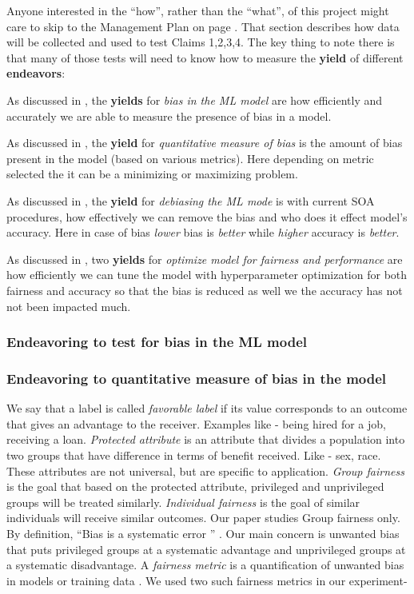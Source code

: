Anyone  interested in the ``how'', rather than the ``what'', of this project
might care to skip to the Management Plan on page \pageref{tion:plan}. That section 
 describes how  data
will be collected  and used
to test Claims 1,2,3,4.  The key thing to note
there is that many of those
tests will need to know how to measure
the {\bf yield} of different {\bf endeavors}:
\bi
\item 
As discussed in , the {\bf yields} for {\em bias in the ML model} are how efficiently and accurately we are able to measure the presence of bias in a model.
\item 
As discussed in , the {\bf yield} for {\em quantitative measure of bias}
is the amount of bias present in the model (based on various metrics). Here depending on metric selected the it can be a minimizing or maximizing problem.
\item 
As discussed in , the {\bf yield} for {\em debiasing the ML mode} is with current SOA procedures, how effectively we can remove the bias and who does it effect model's accuracy. Here in case of bias {\em lower} bias is {\em better} while {\em higher} accuracy is {\em better}.
\item 
As discussed in ,  two {\bf yields} for {\em optimize model for fairness and performance} are how efficiently we can tune the model with hyperparameter optimization for both fairness and accuracy so that the bias is reduced as well we the accuracy has not not been impacted much.
\ei

\subsubsection{Endeavoring to test for bias in the ML model}\label{tion:test_bias}

\subsubsection{Endeavoring to quantitative measure of bias in the model}\label{tion:quantitative_measure}
We say that a label is called \textit{favorable label} if its  value corresponds to an outcome that gives an advantage to the receiver. Examples like - being hired for a job, receiving a loan. \textit{Protected attribute} is an attribute that divides a population into two groups that have difference in terms of benefit received. Like - sex, race. These attributes are not universal, but are specific to application. \textit{Group fairness} is the goal that based on the protected attribute, privileged and unprivileged groups will be treated similarly. \textit{Individual fairness} is the goal of similar individuals will receive similar outcomes.  Our paper studies Group fairness only.
By definition, ``Bias is a systematic error '' \cite{bias_systemetic}. Our main concern is unwanted bias that puts privileged groups at a systematic advantage and unprivileged groups at a systematic disadvantage. A \textit{fairness metric} is a quantification of unwanted bias in models or training data \cite{IBM}. We used two such fairness metrics in our experiment-

